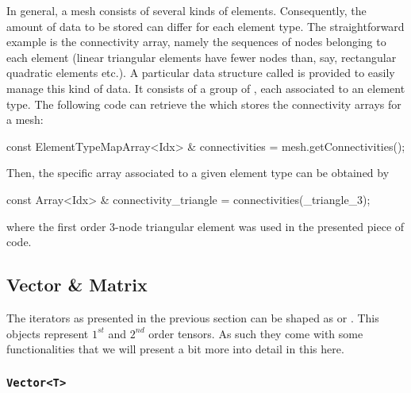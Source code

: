 In general, a mesh consists of several kinds of elements.
Consequently, the amount of data to be stored can differ for each
element type.  The straightforward example is the connectivity array,
namely the sequences of nodes belonging to each element (linear
triangular elements have fewer nodes than, say, rectangular quadratic
elements etc.).  A particular data structure called
 is provided to easily manage this kind of
data.  It consists of a group of , each associated to an
element type.  The following code can retrieve the
 which stores the connectivity arrays for a
mesh:
\begin{cpp}
  const ElementTypeMapArray<Idx> & connectivities = mesh.getConnectivities();
\end{cpp}
Then, the specific array associated to a given element type can be obtained by
\begin{cpp}
  const Array<Idx> & connectivity_triangle = connectivities(_triangle_3);
\end{cpp}
where the first order 3-node triangular element was used in the presented piece
of code.

\subsection{Vector \& Matrix}

The  iterators as presented in the previous section can be shaped as
 or . This objects represent $1^{st}$ and $2^{nd}$
order tensors. As such they come with some functionalities that we will present
a bit more into detail in this here.

\subsubsection{\texttt{Vector<T>}}

